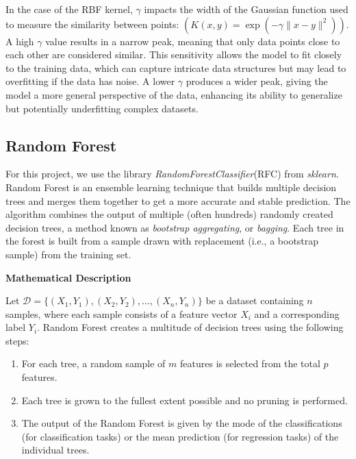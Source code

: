 \documentclass[twocolumn]{article}
\begin{document}
In the case of the RBF kernel, $\gamma$ impacts the width of the Gaussian function used to measure the similarity between points: $(K(x, y) = \exp(-\gamma \| x - y \|^2))$. A high $\gamma$ value results in a narrow peak, meaning that only data points close to each other are considered similar. This sensitivity allows the model to fit closely to the training data, which can capture intricate data structures but may lead to overfitting if the data has noise. A lower $\gamma$ produces a wider peak, giving the model a more general perspective of the data, enhancing its ability to generalize but potentially underfitting complex datasets.

\subsection{Random Forest}
For this project, we use the library \textit{RandomForestClassifier}(RFC) from \textit{sklearn}.
Random Forest is an ensemble learning technique that builds multiple decision trees and merges them together to get a more accurate and stable prediction. The algorithm combines the output of multiple (often hundreds) randomly created decision trees, a method known as \textit{bootstrap aggregating}, or \textit{bagging}. Each tree in the forest is built from a sample drawn with replacement (i.e., a bootstrap sample) from the training set.

\textbf{\large Mathematical Description}

Let \( \mathcal{D} = \{(X_1, Y_1), (X_2, Y_2), \dots, (X_n, Y_n)\} \) be a dataset containing \( n \) samples, where each sample consists of a feature vector \( X_i \) and a corresponding label \( Y_i \). Random Forest creates a multitude of decision trees using the following steps:

\begin{enumerate}
    \item For each tree, a random sample of \( m \) features is selected from the total \( p \) features.
    \item Each tree is grown to the fullest extent possible and no pruning is performed.
    \item The output of the Random Forest is given by the mode of the classifications (for classification tasks) or the mean prediction (for regression tasks) of the individual trees.
\end{enumerate}
\end{document}
